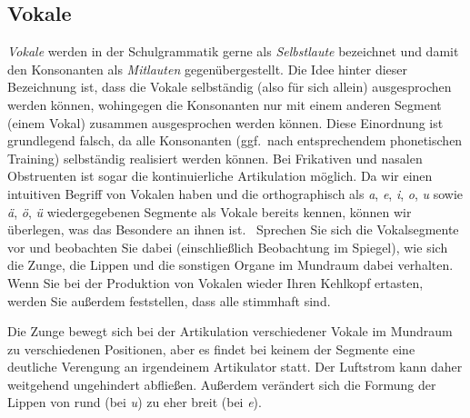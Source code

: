 \subsection{Vokale}

\label{sec:vokale}

\textit{Vokale} werden in der Schulgrammatik gerne als \textit{Selbstlaute} bezeichnet und damit den Konsonanten als \textit{Mitlauten} gegenübergestellt.
Die Idee hinter dieser Bezeichnung ist, dass die Vokale selbständig (also für sich allein) ausgesprochen werden können, wohingegen die Konsonanten nur mit einem anderen Segment (einem Vokal) zusammen ausgesprochen werden können.
Diese Einordnung ist grundlegend falsch, da alle Konsonanten (ggf.\ nach entsprechendem phonetischen Training) selbständig realisiert werden können.
Bei Frikativen und nasalen Obstruenten ist sogar die kontinuierliche Artikulation möglich.
Da wir einen intuitiven Begriff von Vokalen haben und die orthographisch als \textit{a}, \textit{e}, \textit{i}, \textit{o}, \textit{u} sowie \textit{ä}, \textit{ö}, \textit{ü} wiedergegebenen Segmente als Vokale bereits kennen, können wir überlegen, was das Besondere an ihnen ist.
\TuBegin~Sprechen Sie sich die Vokalsegmente vor und beobachten Sie dabei (einschließlich Beobachtung im Spiegel), wie sich die Zunge, die Lippen und die sonstigen Organe im Mundraum dabei verhalten. Wenn Sie bei der Produktion von Vokalen wieder Ihren Kehlkopf ertasten, werden Sie außerdem feststellen, dass alle stimmhaft sind.

Die Zunge bewegt sich bei der Artikulation verschiedener Vokale im Mund\-raum zu verschiedenen Positionen, aber es findet bei keinem der Segmente eine deutliche Verengung an irgendeinem Artikulator statt.
Der Luftstrom kann daher weitgehend ungehindert abfließen.
Außerdem verändert sich die Formung der Lippen von rund (\zB bei \textit{u}) zu eher breit (\zB bei \textit{e}).


